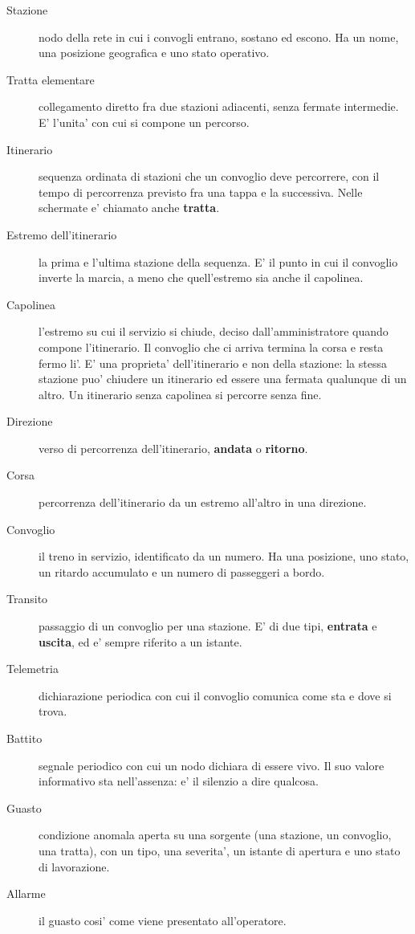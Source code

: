 \documentclass[11pt]{article}
\begin{document}
\begin{description}
\item[{Stazione}] nodo della rete in cui i convogli entrano, sostano ed escono. Ha un nome, una
posizione geografica e uno stato operativo.
\item[{Tratta elementare}] collegamento diretto fra due stazioni adiacenti, senza fermate intermedie.
E' l'unita' con cui si compone un percorso.
\item[{Itinerario}] sequenza ordinata di stazioni che un convoglio deve percorrere, con il tempo di
percorrenza previsto fra una tappa e la successiva. Nelle schermate e' chiamato anche \textbf{tratta}.
\item[{Estremo dell'itinerario}] la prima e l'ultima stazione della sequenza. E' il punto in cui il
convoglio inverte la marcia, a meno che quell'estremo sia anche il capolinea.
\item[{Capolinea}] l'estremo su cui il servizio si chiude, deciso dall'amministratore quando compone
l'itinerario. Il convoglio che ci arriva termina la corsa e resta fermo li'. E' una proprieta'
dell'itinerario e non della stazione: la stessa stazione puo' chiudere un itinerario ed essere
una fermata qualunque di un altro. Un itinerario senza capolinea si percorre senza fine.
\item[{Direzione}] verso di percorrenza dell'itinerario, \textbf{andata} o \textbf{ritorno}.
\item[{Corsa}] percorrenza dell'itinerario da un estremo all'altro in una direzione.
\item[{Convoglio}] il treno in servizio, identificato da un numero. Ha una posizione, uno stato, un
ritardo accumulato e un numero di passeggeri a bordo.
\item[{Transito}] passaggio di un convoglio per una stazione. E' di due tipi, \textbf{entrata} e \textbf{uscita}, ed e'
sempre riferito a un istante.
\item[{Telemetria}] dichiarazione periodica con cui il convoglio comunica come sta e dove si trova.
\item[{Battito}] segnale periodico con cui un nodo dichiara di essere vivo. Il suo valore informativo sta
nell'assenza: e' il silenzio a dire qualcosa.
\item[{Guasto}] condizione anomala aperta su una sorgente (una stazione, un convoglio, una tratta), con
un tipo, una severita', un istante di apertura e uno stato di lavorazione.
\item[{Allarme}] il guasto cosi' come viene presentato all'operatore.

\end{description}
\end{document}
